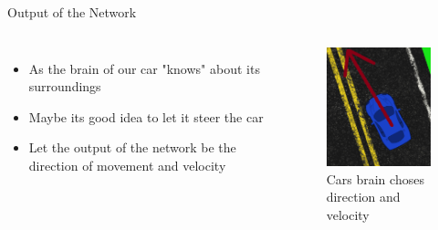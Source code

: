 \documentclass{beamer}
\begin{document}
\begin{frame}{Output of the Network}
    \begin{columns}
        \column{.6\textheight}
        \begin{itemize}
            \item As the brain of our car "knows" about its surroundings
            \item Maybe its good idea to let it steer the car
            \item Let the output of the network be the direction of movement and velocity 
        \end{itemize} 
        \column{.4\textheight}
        \begin{example}
            \begin{figure}
                \includegraphics[width=1.0\linewidth]{cardir.png}
                \caption{\tiny Cars brain choses direction and velocity}
            \end{figure}
        \end{example}
         
    \end{columns}
\end{frame}
\end{document}
